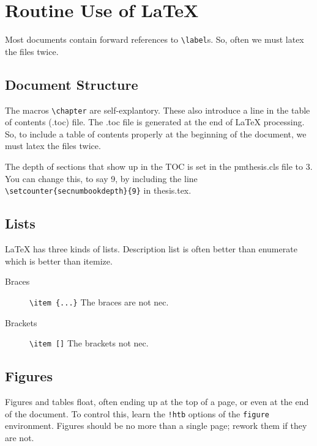 \chapter{Routine Use of {\LaTeX} }

Most documents contain forward references to \verb|\label|s.  So, often we
must latex the files twice.

\section{Document Structure}

The macros \verb|\chapter| are self-explantory.  These also introduce
a line in the table of contents (.toc) file.  The .toc file is generated at
the end of LaTeX processing.  So, to include a table of contents
properly at the beginning of the document, we must latex the files
twice.

The depth of sections that show up in the TOC is set in the
pmthesis.cls file to 3.  You can change this, to say 9, by including
the line \verb|\setcounter{secnumbookdepth}{9}| in thesis.tex.

\section{Lists}

LaTeX has three kinds of lists.  Description list is often better than
enumerate which is better than itemize.

\begin{description}
\item[Braces] \verb|\item {...}| The braces are not nec.
\item[Brackets] \verb|\item []| The brackets not nec.
\end{description}

\section{Figures}

Figures and tables float, often ending up at the top of a page, or
even at the end of the document.  To control this, learn the
\verb|!htb| options of the {\tt figure} environment.  
Figures should be no more than a single page; rework them if
they are not.

